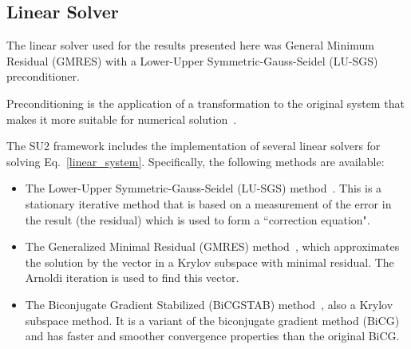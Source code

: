 
\subsection*{Linear Solver}
The linear solver used for the results presented here was General Minimum Residual (GMRES) with a Lower-Upper Symmetric-Gauss-Seidel (LU-SGS) preconditioner. 

Preconditioning is the application of a transformation to the original system that makes it more suitable for numerical solution~\cite{pierce-1997}.


The SU2 framework includes the implementation of several linear solvers for solving Eq.~\ref{linear_system}. Specifically, the following methods are available:
\begin{itemize}
\item The Lower-Upper Symmetric-Gauss-Seidel (LU-SGS) method~\cite{yoon88, jameson81b, jameson87}. This is a stationary iterative method that is based on a measurement of the error in the result (the residual) which is used to form a ``correction equation".
\item The Generalized Minimal Residual (GMRES) method~\cite{saad1986}, which approximates the solution by the vector in a Krylov subspace with minimal residual. The Arnoldi iteration is used to find this vector.
\item The Biconjugate Gradient Stabilized  (BiCGSTAB) method~\cite{Vorst1992}, also a Krylov subspace method. It is a variant of the biconjugate gradient method (BiCG) and has faster and smoother convergence properties than the original BiCG.
\end{itemize}


